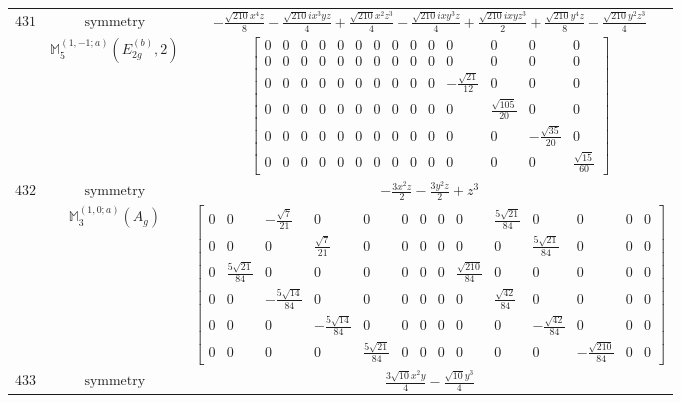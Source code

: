\documentclass[fleqn,8pt,landscape]{jsarticle}
\begin{document}
\begin{longtable}{ccc}
$ 431 $ & $ \text{symmetry} $ & $ - \frac{\sqrt{210} x^{4} z}{8} - \frac{\sqrt{210} i x^{3} y z}{4} + \frac{\sqrt{210} x^{2} z^{3}}{4} - \frac{\sqrt{210} i x y^{3} z}{4} + \frac{\sqrt{210} i x y z^{3}}{2} + \frac{\sqrt{210} y^{4} z}{8} - \frac{\sqrt{210} y^{2} z^{3}}{4} $ \\
$  $ & $ \mathbb{M}_{5}^{(1,-1;a)}(E_{2g}^{(b)},2) $ & $ \begin{bmatrix} 0 & 0 & 0 & 0 & 0 & 0 & 0 & 0 & 0 & 0 & 0 & 0 & 0 & 0 \\ 0 & 0 & 0 & 0 & 0 & 0 & 0 & 0 & 0 & 0 & 0 & 0 & 0 & 0 \\ 0 & 0 & 0 & 0 & 0 & 0 & 0 & 0 & 0 & 0 & - \frac{\sqrt{21}}{12} & 0 & 0 & 0 \\ 0 & 0 & 0 & 0 & 0 & 0 & 0 & 0 & 0 & 0 & 0 & \frac{\sqrt{105}}{20} & 0 & 0 \\ 0 & 0 & 0 & 0 & 0 & 0 & 0 & 0 & 0 & 0 & 0 & 0 & - \frac{\sqrt{35}}{20} & 0 \\ 0 & 0 & 0 & 0 & 0 & 0 & 0 & 0 & 0 & 0 & 0 & 0 & 0 & \frac{\sqrt{15}}{60} \end{bmatrix} $ \\ \hline
$ 432 $ & $ \text{symmetry} $ & $ - \frac{3 x^{2} z}{2} - \frac{3 y^{2} z}{2} + z^{3} $ \\
$  $ & $ \mathbb{M}_{3}^{(1,0;a)}(A_{g}) $ & $ \begin{bmatrix} 0 & 0 & - \frac{\sqrt{7}}{21} & 0 & 0 & 0 & 0 & 0 & 0 & \frac{5 \sqrt{21}}{84} & 0 & 0 & 0 & 0 \\ 0 & 0 & 0 & \frac{\sqrt{7}}{21} & 0 & 0 & 0 & 0 & 0 & 0 & \frac{5 \sqrt{21}}{84} & 0 & 0 & 0 \\ 0 & \frac{5 \sqrt{21}}{84} & 0 & 0 & 0 & 0 & 0 & 0 & \frac{\sqrt{210}}{84} & 0 & 0 & 0 & 0 & 0 \\ 0 & 0 & - \frac{5 \sqrt{14}}{84} & 0 & 0 & 0 & 0 & 0 & 0 & \frac{\sqrt{42}}{84} & 0 & 0 & 0 & 0 \\ 0 & 0 & 0 & - \frac{5 \sqrt{14}}{84} & 0 & 0 & 0 & 0 & 0 & 0 & - \frac{\sqrt{42}}{84} & 0 & 0 & 0 \\ 0 & 0 & 0 & 0 & \frac{5 \sqrt{21}}{84} & 0 & 0 & 0 & 0 & 0 & 0 & - \frac{\sqrt{210}}{84} & 0 & 0 \end{bmatrix} $ \\ \hline
$ 433 $ & $ \text{symmetry} $ & $ \frac{3 \sqrt{10} x^{2} y}{4} - \frac{\sqrt{10} y^{3}}{4} $ \\

\end{longtable}
\end{document}
